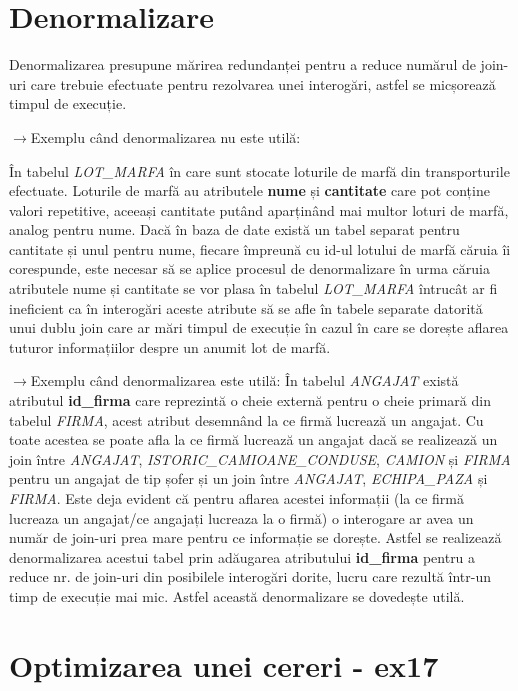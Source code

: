 \documentclass[12pt, a4paper]{article}
\begin{document}
\newpage
\section{Denormalizare}
Denormalizarea presupune mărirea redundanței pentru a reduce numărul de join-uri care trebuie efectuate pentru rezolvarea unei interogări, astfel se micșorează timpul de execuție.

$\rightarrow$Exemplu când denormalizarea nu este utilă:

În tabelul \emph{LOT\_MARFA} în care sunt stocate loturile de marfă din transporturile efectuate. Loturile de marfă au atributele \textbf{nume} și \textbf{cantitate} care pot conține valori repetitive, aceeași cantitate putând aparținând mai multor loturi de marfă, analog pentru nume. Dacă în baza de date există un tabel separat pentru cantitate și unul pentru nume, fiecare împreună cu id-ul lotului de marfă căruia îi corespunde, este necesar să se aplice procesul de denormalizare în urma căruia atributele nume și cantitate se vor plasa în tabelul \emph{LOT\_MARFA} întrucât ar fi ineficient ca în interogări aceste atribute să se afle în tabele separate datorită unui dublu join care ar mări timpul de execuție în cazul în care se dorește aflarea tuturor informațiilor despre un anumit lot de marfă.

$\rightarrow$Exemplu când denormalizarea este utilă:
În tabelul \emph{ANGAJAT} există atributul \textbf{id\_firma} care reprezintă o cheie externă pentru o cheie primară din tabelul \emph{FIRMA}, acest atribut desemnând la ce firmă lucrează un angajat. Cu toate acestea se poate afla la ce firmă lucrează un angajat dacă se realizează un join între \emph{ANGAJAT}, \emph{ISTORIC\_CAMIOANE\_CONDUSE}, \emph{CAMION} și \emph{FIRMA} pentru un angajat de tip șofer și un join între \emph{ANGAJAT}, \emph{ECHIPA\_PAZA} și \emph{FIRMA}. Este deja evident că pentru aflarea acestei informații (la ce firmă lucreaza un angajat/ce angajați lucreaza la o firmă) o interogare ar avea un număr de join-uri prea mare pentru ce informație se dorește. Astfel se realizează denormalizarea acestui tabel prin adăugarea atributului \textbf{id\_firma} pentru a reduce nr. de join-uri din posibilele interogări dorite, lucru care rezultă într-un timp de execuție mai mic. Astfel această denormalizare se dovedește utilă.

\newpage

\newpage
\section{Optimizarea unei cereri - ex17}
\end{document}
